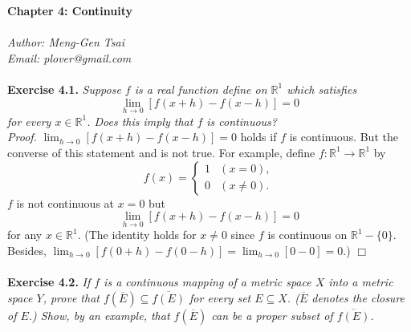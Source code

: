 \documentclass{article}
\begin{document}
\textbf{\Large Chapter 4: Continuity} \\\\



\emph{Author: Meng-Gen Tsai} \\
\emph{Email: plover@gmail.com} \\\\









\textbf{Exercise 4.1.}
\emph{Suppose $f$ is a real function define on $\mathbb{R}^1$ which satisfies
$$\lim_{h \to 0}[f(x+h)-f(x-h)] = 0$$
for every $x \in \mathbb{R}^1$.
Does this imply that $f$ is continuous?} \\

\emph{Proof.}
$\lim_{h \to 0}[f(x+h)-f(x-h)] = 0$ holds if $f$ is continuous.
But the converse of this statement and is not true.
For example, define $f: \mathbb{R}^1 \to \mathbb{R}^1$ by
\begin{equation*}
  f(x) =
    \begin{cases}
      1 & (x = 0), \\
      0 & (x \neq 0).
    \end{cases}
\end{equation*}
$f$ is not continuous at $x = 0$ but
$$\lim_{h \to 0}[f(x+h)-f(x-h)] = 0$$ for any $x \in \mathbb{R}^1$.
(The identity holds for $x \neq 0$ since $f$ is continuous on $\mathbb{R}^1 - \{0\}$.
Besides, $\lim_{h \to 0}[f(0+h)-f(0-h)] = \lim_{h \to 0}[0 - 0] = 0$.)
$\Box$ \\\\






\textbf{Exercise 4.2.}
\emph{If $f$ is a continuous mapping of a metric space $X$
into a metric space $Y$,
prove that $f(\overline{E}) \subseteq \overline{f(E)}$
for every set $E \subseteq X$.
($\overline{E}$ denotes the closure of $E$.)
Show, by an example, that $f(\overline{E})$ can be a proper subset of $\overline{f(E)}$.} \\
\end{document}
